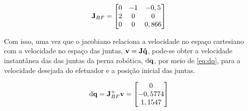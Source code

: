 \begin{equation}\label{eq:JBF}
	\mathbf{J}_{BF} = \begin{bmatrix}
		0 & -1 & -0,5 \\
		2 & 0 & 0 \\
		0 & 0 & 0,866
	\end{bmatrix}
\end{equation}

Com isso, uma vez que o jacobiano relaciona a velocidade no espaço cartesiano com a velocidade no espaço das juntas, $\mathbf{v} = \mathbf{J}\mathbf{\Dot{q}}$, pode-se obter a velocidade instantânea das das juntas da perna robótica, $\text{d}\mathbf{q}$, por meio de \eqref{eq:dq}, para a velocidade desejada do efetuador e a posição inicial das juntas.

\begin{equation}\label{eq:dq}
	\text{d}\mathbf{q} = \mathbf{J}_{BF}^+ \mathbf{v} = \begin{bmatrix}0 \\ -0,5774 \\ 1,1547 	\end{bmatrix}
\end{equation}





\section{}




\section{}
